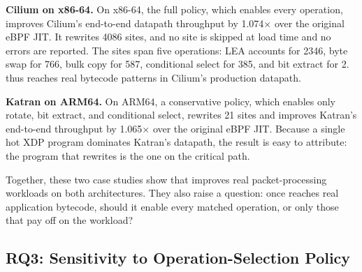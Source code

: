 \noindent\textbf{Cilium on x86-64.}
On x86-64, the full \lang policy, which enables every \lang operation, improves Cilium's end-to-end datapath throughput by 1.074$\times$ over the original eBPF JIT.
It rewrites 4086 sites, and no site is skipped at load time and no errors are reported.
The sites span five \lang operations: LEA accounts for 2346, byte swap for 766, bulk copy for 587, conditional select for 385, and bit extract for 2.
\lang thus reaches real bytecode patterns in Cilium's production datapath.

\noindent\textbf{Katran on ARM64.}
On ARM64, a conservative \lang policy, which enables only rotate, bit extract, and conditional select, rewrites 21 sites and improves Katran's end-to-end throughput by 1.065$\times$ over the original eBPF JIT.
Because a single hot XDP program dominates Katran's datapath, the result is easy to attribute: the program that \lang rewrites is the one on the critical path.

Together, these two case studies show that \lang improves real packet-processing workloads on both architectures.
They also raise a question: once \lang reaches real application bytecode, should it enable every matched \lang operation, or only those that pay off on the workload?





\subsection{RQ3: Sensitivity to Operation-Selection Policy}
\label{subsec:policy_sensitivity}


